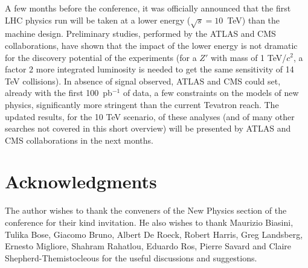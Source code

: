 \documentclass{cmspaper}
\begin{document}
A few months before the conference, it was officially announced 
that the first LHC physics run will be taken at a lower energy 
($\sqrt{s} = 10$~TeV) than the machine design. Preliminary 
studies, performed by the ATLAS and CMS collaborations, 
have shown that the impact of the lower energy is not dramatic for the 
discovery potential of the experiments (for a $Z'$ with mass of 1 TeV/$c^2$, 
a factor 2 more integrated luminosity is needed to get the same 
sensitivity of 14 TeV collisions). 
In absence of signal observed, ATLAS and CMS could set, already with the 
first 100~pb$^{-1}$ of data, a few constraints on the models of new physics, 
significantly more stringent than the current Tevatron reach. 
The updated results, for the 10 TeV scenario, of these analyses (and of 
many other searches not covered in this short overview) 
will be presented by ATLAS and CMS collaborations 
in the next months.

\section{Acknowledgments}
The author wishes to thank the conveners of the New Physics 
section of the conference for their kind invitation. 
He also wishes to thank Maurizio Biasini, Tulika Bose, Giacomo Bruno, Albert De Roeck, Robert Harris, 
Greg Landsberg, Ernesto Migliore, Shahram Rahatlou, Eduardo Ros, Pierre Savard and Claire 
Shepherd-Themistocleous  for the useful discussions and suggestions.




\end{document}
